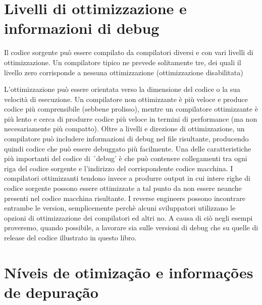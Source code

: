 \ifdefined\ITALIAN
\section*{Livelli di ottimizzazione e informazioni di debug}

Il codice sorgente può essere compilato da compilatori diversi e con vari livelli di ottimizzazione.
Un compilatore tipico ne prevede solitamente tre, dei quali il livello zero corrisponde a nessuna ottimizzazione (ottimizzazione disabilitata) 

L'ottimizzazione può essere orientata verso la dimensione del codice o la sua velocità di esecuzione.
Un compilatore non ottimizzante è più veloce e produce codice più comprensibile (sebbene prolisso), mentre un compilatore ottimizzante è più lento e cerca di produrre codice più veloce in termini di performance (ma non necesariamente più compatto).
Oltre a livelli e direzione di ottimizzazione, un compilatore può includere informazioni di debug nel file risultante, producendo quindi codice che può essere debuggato più facilmente.
Una delle caratteristiche più importanti del codice di ´debug' è che può contenere collegamenti tra ogni riga del codice sorgente e l'indirizzo del corrispondente codice macchina.
I compilatori ottimizzanti tendono invece a produrre output in cui intere righe di codice sorgente possono essere ottimizzate a tal punto da non essere neanche presenti nel codice macchina risultante.
I reverse engineers possono incontrare entrambe le version, semplicemente perchè alcuni sviluppatori utilizzano le opzioni di ottimizzazione dei compilatori ed altri no. A causa di ciò negli esempi proveremo, quando possibile, a lavorare sia sulle versioni di debug che su quelle di release del codice illustrato in questo libro.
\fi %

\ifdefined\BRAZILIAN
\section*{Níveis de otimização e informações de depuração}

